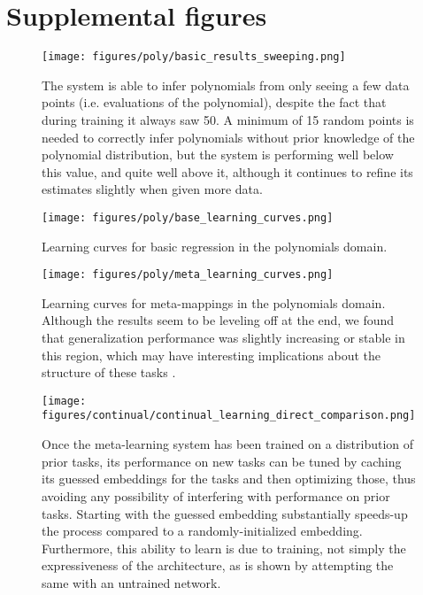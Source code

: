 \section{Supplemental figures} \label{app_supp_figures}
\begin{figure}[H]
\centering
\texttt{[image: figures/poly/basic\_results\_sweeping.png]}
\caption{The system is able to infer polynomials from only seeing a few data points (i.e. evaluations of the polynomial), despite the fact that during training it always saw 50. A minimum of 15 random points is needed to correctly infer polynomials without prior knowledge of the polynomial distribution, but the system is performing well below this value, and quite well above it, although it continues to refine its estimates slightly when given more data.}
\label{supp_poly_sweep_results}
\end{figure}

\begin{figure}[H]
\centering
\texttt{[image: figures/poly/base\_learning\_curves.png]}
\caption{Learning curves for basic regression in the polynomials domain.}
\label{supp_poly_basic_learning_curves}
\end{figure}

\begin{figure}[H]
\centering
\texttt{[image: figures/poly/meta\_learning\_curves.png]}
\caption{Learning curves for meta-mappings in the polynomials domain. Although the results seem to be leveling off at the end, we found that generalization performance was slightly increasing or stable in this region, which may have interesting implications about the structure of these tasks \citep{Lampinen2019}.}
\label{supp_poly_meta_learning_curves}
\end{figure}

\begin{figure}[H]
\centering
\texttt{[image: figures/continual/continual\_learning\_direct\_comparison.png]}
\caption{Once the meta-learning system has been trained on a distribution of prior tasks, its performance on new tasks can be tuned by caching its guessed embeddings for the tasks and then optimizing those, thus avoiding any possibility of interfering with performance on prior tasks. Starting with the guessed embedding substantially speeds-up the process compared to a randomly-initialized embedding. Furthermore, this ability to learn is due to training, not simply the expressiveness of the architecture, as is shown by attempting the same with an untrained network.}
\label{supp_poly_continual_results}
\end{figure}

